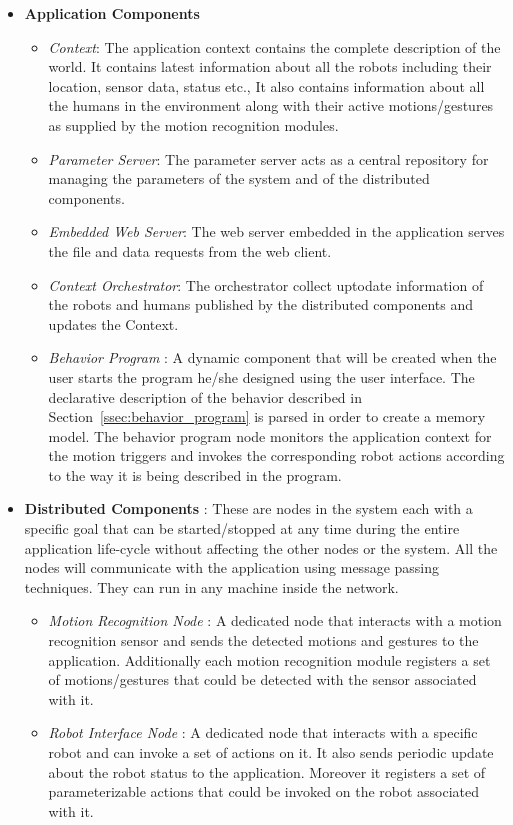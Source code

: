 \documentclass{llncs}
\begin{document}
\begin{itemize}
\item \textbf{Application Components}
\begin{itemize}
\item \emph{Context}: The application context contains the complete description of the world. It contains latest information about all the robots including their location, sensor data, status etc., It also contains information about all the humans in the environment along with their active motions/gestures as supplied by the motion recognition modules.
\item \emph{Parameter Server}: The parameter server acts as a central repository for managing the parameters of the system and of the distributed components.
\item \emph{Embedded Web Server}: The web server embedded in the application serves the file and data requests from the web client.
\item \emph{Context Orchestrator}: The orchestrator collect uptodate information of the robots and humans published by the distributed components and updates the Context.
\item \emph{Behavior Program} : A dynamic component that will be created when the user starts the program he/she designed using the user interface. The declarative description of the behavior described in Section~\ref{ssec:behavior_program} is parsed in order to create a memory model. The behavior program node monitors the application context for the motion triggers and invokes the corresponding robot actions according to the way it is being described in the program.
\end{itemize}
\item \textbf{Distributed Components} : These are nodes in the system each with a specific goal that can be started/stopped at any time during the entire application life-cycle without affecting the other nodes or the system. All the nodes will communicate with the application using message passing techniques. They can run in any machine inside the network.
\begin{itemize}
\item \emph{Motion Recognition Node} : A dedicated node that interacts with a motion recognition sensor and sends the detected motions and gestures to the application. Additionally each motion recognition module registers a set of motions/gestures that could be detected with the sensor associated with it.
\item \emph{Robot Interface Node} : A dedicated node that interacts with a specific robot and can invoke a set of actions on it. It also sends periodic update about the robot status to the application. Moreover it registers a set of parameterizable actions that could be invoked on the robot associated with it.

\end{itemize}
\end{itemize}
\end{document}
